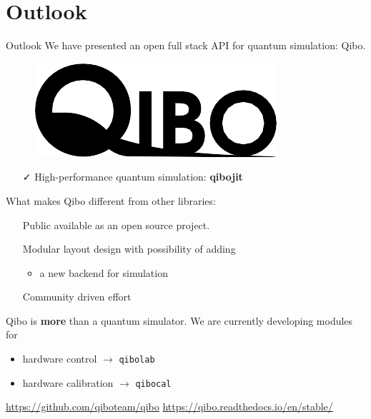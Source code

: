 \documentclass[11p,aspectratio=169]{beamer}
\begin{document}
\section{Outlook}

\begin{frame}{Outlook}
    We have presented an open full stack API for quantum simulation: Qibo.

    \begin{figure}
        \includegraphics[width=0.9\linewidth]{figures/qibo_logo.png} 
        \end{figure}
    \begin{itemize}


        \item[ \color{teal} \faCheck] High-performance quantum simulation: {\color{blue} \textbf{qibojit}}
    \end{itemize}

    What makes Qibo different from other libraries:
    \begin{itemize}
        \item[ \faPlus] Public available as an open source project.
        \item[ \faPlus] Modular layout design with possibility of adding
        \begin{itemize}
            \item a new backend for simulation
        \end{itemize}
        \item[ \faPlus] Community driven effort
    \end{itemize}

    Qibo is \textbf{more} than a quantum simulator. We are currently developing modules for
    
    \begin{itemize}
        \item hardware control $\rightarrow$  \texttt{qibolab}
        \item hardware calibration $\rightarrow$ \texttt{qibocal}
    \end{itemize}

    \url{https://github.com/qiboteam/qibo} \hfill \url{https://qibo.readthedocs.io/en/stable/}
\end{frame}
\end{document}
